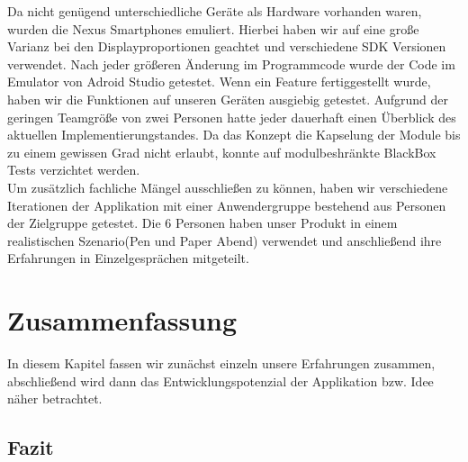 Da nicht genügend unterschiedliche Geräte als Hardware vorhanden waren, wurden die Nexus Smartphones emuliert. Hierbei haben wir auf eine große Varianz bei den Displayproportionen geachtet und verschiedene SDK Versionen verwendet. Nach jeder größeren Änderung im Programmcode wurde der Code im Emulator von Adroid Studio getestet. Wenn ein Feature fertiggestellt wurde, haben wir die Funktionen auf unseren Geräten ausgiebig getestet. Aufgrund der geringen Teamgröße von zwei Personen hatte jeder dauerhaft einen Überblick des aktuellen Implementierungstandes. Da das Konzept die Kapselung der Module bis zu einem gewissen Grad nicht erlaubt, konnte auf modulbeshränkte BlackBox Tests verzichtet werden.\\ 
Um zusätzlich fachliche Mängel ausschließen zu können, haben wir verschiedene Iterationen der Applikation mit einer Anwendergruppe bestehend aus Personen der Zielgruppe getestet. Die 6 Personen haben unser Produkt in einem realistischen Szenario(Pen und Paper Abend) verwendet und anschließend ihre Erfahrungen in Einzelgesprächen mitgeteilt.

\section{Zusammenfassung}
In diesem Kapitel fassen wir zunächst einzeln unsere Erfahrungen zusammen, abschließend wird dann das Entwicklungspotenzial der Applikation bzw. Idee näher betrachtet.
\subsection{Fazit}
